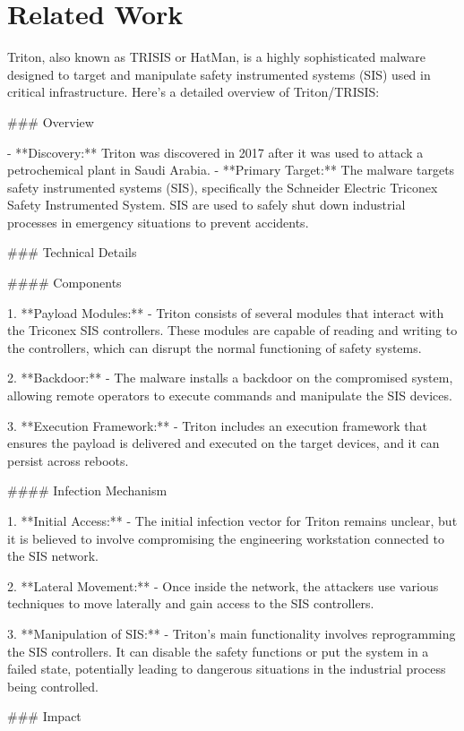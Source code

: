 \section{Related Work}
\label{sec:related_work}


Triton, also known as TRISIS or HatMan, is a highly sophisticated malware designed to target and manipulate safety instrumented systems (SIS) used in critical infrastructure. Here's a detailed overview of Triton/TRISIS:

### Overview

- **Discovery:** Triton was discovered in 2017 after it was used to attack a petrochemical plant in Saudi Arabia.
- **Primary Target:** The malware targets safety instrumented systems (SIS), specifically the Schneider Electric Triconex Safety Instrumented System. SIS are used to safely shut down industrial processes in emergency situations to prevent accidents.

### Technical Details

#### Components

1. **Payload Modules:**
   - Triton consists of several modules that interact with the Triconex SIS controllers. These modules are capable of reading and writing to the controllers, which can disrupt the normal functioning of safety systems.

2. **Backdoor:**
   - The malware installs a backdoor on the compromised system, allowing remote operators to execute commands and manipulate the SIS devices.

3. **Execution Framework:**
   - Triton includes an execution framework that ensures the payload is delivered and executed on the target devices, and it can persist across reboots.

#### Infection Mechanism

1. **Initial Access:**
   - The initial infection vector for Triton remains unclear, but it is believed to involve compromising the engineering workstation connected to the SIS network.

2. **Lateral Movement:**
   - Once inside the network, the attackers use various techniques to move laterally and gain access to the SIS controllers.

3. **Manipulation of SIS:**
   - Triton’s main functionality involves reprogramming the SIS controllers. It can disable the safety functions or put the system in a failed state, potentially leading to dangerous situations in the industrial process being controlled.

### Impact

